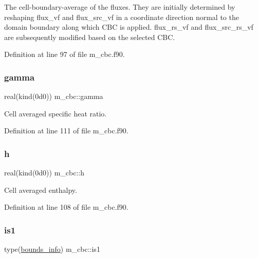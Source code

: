 The cell-\/boundary-\/average of the fluxes. They are initially determined by reshaping flux\+\_\+vf and flux\+\_\+src\+\_\+vf in a coordinate direction normal to the domain boundary along which C\+BC is applied. flux\+\_\+rs\+\_\+vf and flux\+\_\+src\+\_\+rs\+\_\+vf are subsequently modified based on the selected C\+BC. 



Definition at line 97 of file m\+\_\+cbc.\+f90.

\mbox{\label{namespacem__cbc_aa657c2e47d8b48e2648c12a454ceec96}} 
\subsubsection{\texorpdfstring{gamma}{gamma}}
{\footnotesize\ttfamily real(kind(0d0)) m\+\_\+cbc\+::gamma}



Cell averaged specific heat ratio. 



Definition at line 111 of file m\+\_\+cbc.\+f90.

\mbox{\label{namespacem__cbc_afef2a31e21e4f17b6852005a08ee86ce}} 
\subsubsection{\texorpdfstring{h}{h}}
{\footnotesize\ttfamily real(kind(0d0)) m\+\_\+cbc\+::h}



Cell averaged enthalpy. 



Definition at line 108 of file m\+\_\+cbc.\+f90.

\mbox{\label{namespacem__cbc_a2995ecb6263724a4421d1622f513103c}} 
\subsubsection{\texorpdfstring{is1}{is1}}
{\footnotesize\ttfamily type(\hyperlink{structm__derived__types_1_1bounds__info}{bounds\+\_\+info}) m\+\_\+cbc\+::is1}



